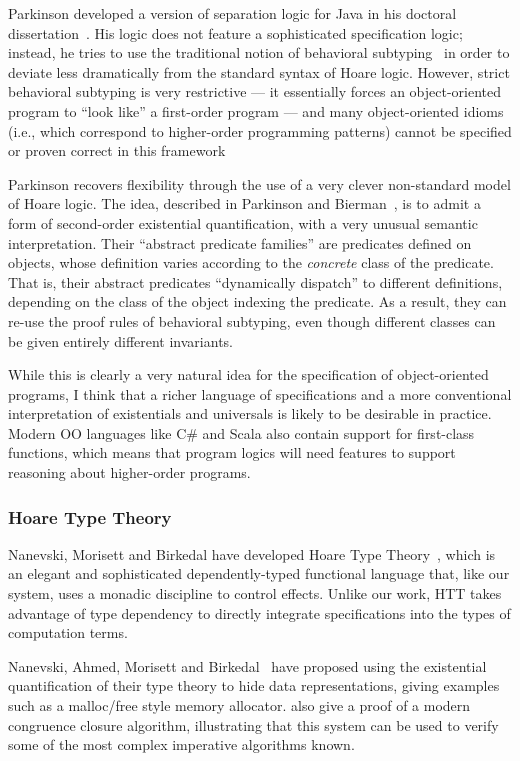 Parkinson developed a version of separation logic for Java in his
doctoral dissertation~\cite{parkinson-thesis}. His logic does not
feature a sophisticated specification logic; instead, he tries to use
the traditional notion of behavioral
subtyping~\cite{behavioral-subtyping} in order to deviate less
dramatically from the standard syntax of Hoare logic. However, strict
behavioral subtyping is very restrictive --- it essentially forces an
object-oriented program to ``look like'' a first-order program --- and
many object-oriented idioms (i.e., which correspond to higher-order
programming patterns) cannot be specified or proven correct in this 
framework 

Parkinson recovers flexibility through the use of a very clever
non-standard model of Hoare logic. The idea, described in Parkinson
and Bierman~\cite{parkinson-bierman-05}, is to admit a form of
second-order existential quantification, with a very unusual semantic
interpretation. Their ``abstract predicate families'' are predicates
defined on objects, whose definition varies according to the
\emph{concrete} class of the predicate. That is, their abstract
predicates ``dynamically dispatch'' to different definitions,
depending on the class of the object indexing the predicate. As a
result, they can re-use the proof rules of behavioral subtyping, even
though different classes can be given entirely different invariants.

While this is clearly a very natural idea for the specification of
object-oriented programs, I think that a richer language of
specifications and a more conventional interpretation of existentials
and universals is likely to be desirable in practice. Modern OO
languages like C\# and Scala also contain support for first-class
functions, which means that program logics will need features to
support reasoning about higher-order programs.

\subsubsection{Hoare Type Theory}

Nanevski, Morisett and Birkedal have developed Hoare Type
Theory~\cite{htt, nanevski08}, which is an elegant and sophisticated
dependently-typed functional language that, like our system, uses a
monadic discipline to control effects.  Unlike our work, HTT takes
advantage of type dependency to directly integrate specifications into
the types of computation terms.

Nanevski, Ahmed, Morisett and Birkedal~\cite{abstract-htt} have
proposed using the existential quantification of their type theory to
hide data representations, giving examples such as a malloc/free style
memory allocator. \citet{nanevski-victor-10} also give
a proof of a modern congruence closure algorithm, illustrating that
this system can be used to verify some of the most complex imperative
algorithms known.

